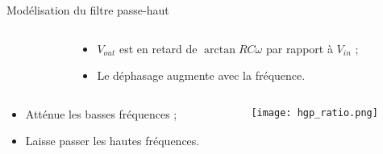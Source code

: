 \documentclass[pdf]{beamer}
\begin{document}
\begin{frame}{Modélisation du filtre passe-haut}
	\begin{columns}
		\begin{column}{5cm}
		\end{column}
		
		\begin{column}{5cm}
			\begin{itemize}
				\item $V_{out}$ est en retard de $\arctan{RC\omega}$ par rapport à $V_{in}$ ;
				\item Le déphasage augmente avec la fréquence.
			\end{itemize}
		\end{column}
	\end{columns}
	
	\begin{columns}
		\begin{column}{5cm}
			\begin{itemize}
				\item Atténue les basses fréquences ;
				\item Laisse passer les hautes fréquences.
			\end{itemize}
		\end{column}

		\begin{column}{5cm}
			\scalebox{0.5}
			{\texttt{[image: hgp\_ratio.png]}}
		\end{column}
	\end{columns}
\end{frame}
\end{document}
